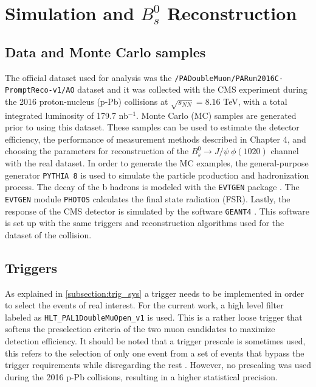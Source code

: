 \chapter[\leavevmode\newline Simulation and $B^0_s$ Reconstruction]{Simulation and $B^0_s$ Reconstruction}
\label{chap:Chapter_3}
\section{Data and Monte Carlo samples}
The official dataset used for analysis was the \verb|/PADoubleMuon/PARun2016C-PromptReco-v1/AO| dataset and it was collected with the CMS experiment during the 2016 proton-nucleus (p-Pb) collisions at $\sqrt{s_{NN}} = 8.16$ TeV, with a total integrated luminosity of 179.7 nb$^{-1}$. Monte Carlo (MC) samples are generated prior to using this dataset. These samples can be used to estimate the detector efficiency, the performance of measurement methods described in Chapter 4, and choosing the parameters for reconstruction  of the $B^0_s \to J/\psi \ \phi(1020)$ channel with the real dataset. In order to generate the MC examples, the general-purpose generator \verb|PYTHIA 8| \cite{sjostrand2015introduction} is used to simulate the particle production and hadronization process. The decay of the b hadrons is modeled with the \verb|EVTGEN| package \cite{lange2001evtgen}. The \verb|EVTGEN| module \verb|PHOTOS| \cite{davidson2016photos} calculates the final state radiation (FSR). Lastly, the response of the CMS detector is simulated by the software \verb|GEANT4| \cite{agostinelli2003geant4}. This software is set up with the same triggers and reconstruction algorithms used for the dataset of the collision. %

\section{Triggers}
As explained in \ref{subsection:trig_sys} a trigger needs to be implemented in order to select the events of real interest. For the current work, a high level filter labeled as \verb|HLT_PAL1DoubleMuOpen_v1| is used. This is a rather loose trigger that softens the preselection criteria of the two muon candidates to maximize detection efficiency. It should be noted that a trigger prescale is sometimes used, this refers to the selection of only one event from a set of events that bypass the trigger requirements while disregarding the rest \cite{dorigo_2014}. However, no prescaling was used during the 2016 p-Pb collisions, resulting in a higher statistical precision.


